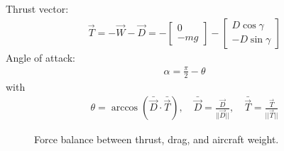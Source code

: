 \documentclass[letterpaper,10pt,english]{sphinxmanual}
\let\sphinxpxdimen\pdfpxdimen\else\newdimen\sphinxpxdimen
\begin{document}
\sphinxAtStartPar
Thrust vector:
\begin{equation*}
\begin{split}\vec{T} = -\vec{W} - \vec{D} = - \begin{bmatrix}0 \\ - mg\end{bmatrix} - \begin{bmatrix}D \cos \gamma \\ - D \sin \gamma \end{bmatrix}\end{split}
\end{equation*}
\sphinxAtStartPar
Angle of attack:
\begin{equation*}
\begin{split}\alpha = \frac{\pi}{2} - \theta\end{split}
\end{equation*}
\sphinxAtStartPar
with
\begin{equation*}
\begin{split}\theta = \arccos(\bar{\vec{D}} \cdot \bar{\vec{T}}), \quad \bar{\vec{D}} = \frac{\vec{D}}{ ||\vec{D}|| } , \quad \bar{\vec{T}} = \frac{\vec{T}}{ ||\vec{T}|| }\end{split}
\end{equation*}
\begin{figure}[htbp]
\centering
\capstart

\noindent\sphinxincludegraphics[width=270\sphinxpxdimen]{{aoa}.png}
\caption{Force balance between thrust, drag, and aircraft weight.}\label{\detokenize{modules/aircraft:id2}}\end{figure}
\label{\detokenize{modules/aircraft:module-aircraft}}
\end{document}
